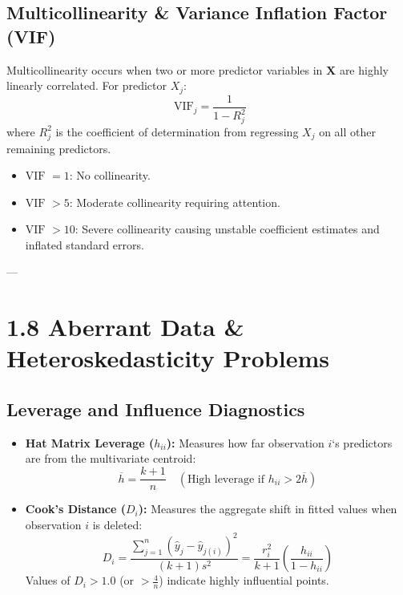 \documentclass[
]{article}
\begin{document}
\textbf{ }

\subsection{Multicollinearity \& Variance Inflation Factor (VIF)}

Multicollinearity occurs when two or more predictor variables in
\(\mathbf{X}\) are highly linearly correlated. For predictor \(X_{j}\):
\[\text{ VIF}_{j} = \frac{1}{1 - R_{j}^{2}}\] where \(R_{j}^{2}\) is the
coefficient of determination from regressing \(X_{j}\) on all other
remaining predictors.

\begin{itemize}
\item
  \(\text{VIF } = 1\): No collinearity.
\item
  \(\text{VIF } > 5\): Moderate collinearity requiring attention.
\item
  \(\text{VIF } > 10\): Severe collinearity causing unstable coefficient
  estimates and inflated standard errors.
\end{itemize}

---

\textbf{ }

\section{1.8 Aberrant Data \& Heteroskedasticity Problems}

\textbf{ }

\subsection{Leverage and Influence Diagnostics}

\begin{itemize}
\item
  \textbf{Hat Matrix Leverage (\(h_{ii}\)):} Measures how far
  observation \(i\)`s predictors are from the multivariate centroid:
  \[\overline{h} = \frac{k + 1}{n}\quad\left( \text{High leverage if  }h_{ii} > 2\overline{h} \right)\]
\item
  \textbf{Cook's Distance (\(D_{i}\)):} Measures the aggregate shift in
  fitted values when observation \(i\) is deleted:
  \[D_{i} = \frac{\sum_{j = 1}^{n}\left( {\hat{y}}_{j} - {\hat{y}}_{j(i)} \right)^{2}}{(k + 1)s^{2}} = \frac{r_{i}^{2}}{k + 1}\left( \frac{h_{ii}}{1 - h_{ii}} \right)\]
  Values of \(D_{i} > 1.0\) (or \(> \frac{4}{n}\)) indicate highly
  influential points.
\end{itemize}
\end{document}
